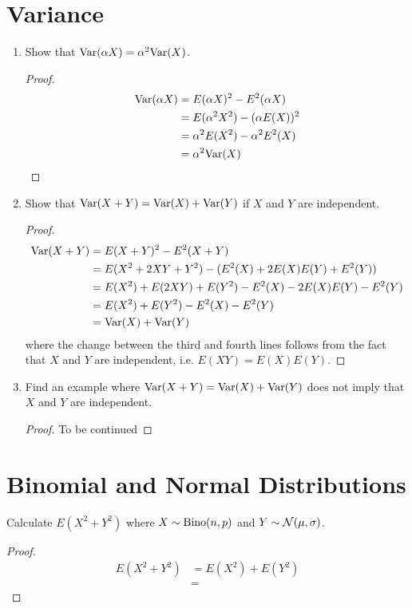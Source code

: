 \documentclass{article}
\begin{document}
\section{Variance}
    \begin{enumerate}[label=\roman*)]
        \item Show that $\text{Var}(\alpha X) = \alpha^2\text{Var}(X)$.  
            \begin{proof}
                \begin{align*}
                    \text{Var}(\alpha X) &= E(\alpha X)^2 - E^2(\alpha X)\\
                    &= E(\alpha^2X^2) - (\alpha E(X))^2\\
                    &= \alpha^2E(X^2) - \alpha^2 E^2(X)\\
                    &= \alpha^2\text{Var}(X)
                \end{align*}
            \end{proof}
        \item Show that $\text{Var}(X + Y) = \text{Var}(X) + \text{Var}(Y)$ if $X$ and $Y$ are
        independent.
            \begin{proof}
                \begin{align*}
                    \text{Var}(X + Y) &= E(X + Y)^2 - E^2(X + Y)\\
                    &= E(X^2 + 2XY + Y^2) - (E^2(X) + 2E(X)E(Y) + E^2(Y))\\
                    &= E(X^2) + E(2XY) + E(Y^2) - E^2(X) - 2E(X)E(Y) - E^2(Y)\\
                    &= E(X^2) + E(Y^2) - E^2(X) - E^2(Y)\\
                    &= \text{Var}(X) + \text{Var}(Y)
                \end{align*} 
                where the change between the third and fourth lines follows from
                the fact that $X$ and $Y$ are independent, i.e. $E(XY) =
                E(X)E(Y)$.
            \end{proof}
        \item Find an example where $\text{Var}(X + Y) = \text{Var}(X) + \text{Var}(Y)$ does not
        imply that $X$ and $Y$ are independent. 
            \begin{proof}
                To be continued
            \end{proof}
    \end{enumerate}

\section{Binomial and Normal Distributions}
    Calculate $E(X^2 + Y^2)$ where $X \sim \text{Bino}(n, p)$ and $Y \sim
    \mathcal{N}(\mu,\sigma)$. 
    \begin{proof}
        \begin{align*}
            E(X^2 + Y^2) &= E(X^2) + E(Y^2)\\
            &= 
        \end{align*}
    \end{proof}
\end{document}
